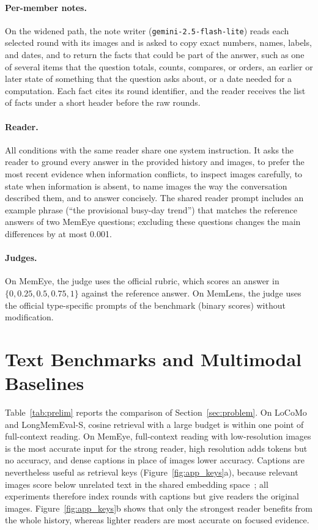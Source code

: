 \paragraph{Per-member notes.} On the widened path, the note writer (\texttt{gemini-2.5-flash-lite}) reads each selected round with its images and is asked to copy exact numbers, names, labels, and dates, and to return the facts that could be part of the answer, such as one of several items that the question totals, counts, compares, or orders, an earlier or later state of something that the question asks about, or a date needed for a computation. Each fact cites its round identifier, and the reader receives the list of facts under a short header before the raw rounds.

\paragraph{Reader.} All conditions with the same reader share one system instruction. It asks the reader to ground every answer in the provided history and images, to prefer the most recent evidence when information conflicts, to inspect images carefully, to state when information is absent, to name images the way the conversation described them, and to answer concisely. The shared reader prompt includes an example phrase (``the provisional busy-day trend'') that matches the reference answers of two MemEye questions; excluding these questions changes the main differences by at most 0.001.

\paragraph{Judges.} On MemEye, the judge uses the official rubric, which scores an answer in $\{0, 0.25, 0.5, 0.75, 1\}$ against the reference answer. On MemLens, the judge uses the official type-specific prompts of the benchmark (binary scores) without modification.

\section{Text Benchmarks and Multimodal Baselines}
\label{app:text}

Table~\ref{tab:prelim} reports the comparison of Section~\ref{sec:problem}. On LoCoMo and LongMemEval-S, cosine retrieval with a large budget is within one point of full-context reading. On MemEye, full-context reading with low-resolution images is the most accurate input for the strong reader, high resolution adds tokens but no accuracy, and dense captions in place of images lower accuracy. Captions are nevertheless useful as retrieval keys (Figure~\ref{fig:app_keys}a), because relevant images score below unrelated text in the shared embedding space~\citep{liang2022modalitygap}; all experiments therefore index rounds with captions but give readers the original images. Figure~\ref{fig:app_keys}b shows that only the strongest reader benefits from the whole history, whereas lighter readers are most accurate on focused evidence.

